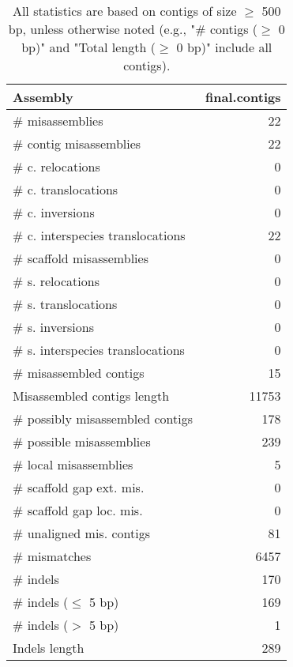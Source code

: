 \documentclass[12pt,a4paper]{article}
\begin{document}
\begin{table}[ht]
\begin{center}
\caption{All statistics are based on contigs of size $\geq$ 500 bp, unless otherwise noted (e.g., "\# contigs ($\geq$ 0 bp)" and "Total length ($\geq$ 0 bp)" include all contigs).}
\begin{tabular}{|l*{1}{|r}|}
\hline
Assembly & final.contigs \\ \hline
\# misassemblies & 22 \\ \hline
\hspace{2mm}\# contig misassemblies & 22 \\ \hline
\hspace{5mm}\# c. relocations & 0 \\ \hline
\hspace{5mm}\# c. translocations & 0 \\ \hline
\hspace{5mm}\# c. inversions & 0 \\ \hline
\hspace{5mm}\# c. interspecies translocations & 22 \\ \hline
\hspace{2mm}\# scaffold misassemblies & 0 \\ \hline
\hspace{5mm}\# s. relocations & 0 \\ \hline
\hspace{5mm}\# s. translocations & 0 \\ \hline
\hspace{5mm}\# s. inversions & 0 \\ \hline
\hspace{5mm}\# s. interspecies translocations & 0 \\ \hline
\# misassembled contigs & 15 \\ \hline
Misassembled contigs length & 11753 \\ \hline
\# possibly misassembled contigs & 178 \\ \hline
\hspace{5mm}\# possible misassemblies & 239 \\ \hline
\# local misassemblies & 5 \\ \hline
\# scaffold gap ext. mis. & 0 \\ \hline
\# scaffold gap loc. mis. & 0 \\ \hline
\# unaligned mis. contigs & 81 \\ \hline
\# mismatches & 6457 \\ \hline
\# indels & 170 \\ \hline
\hspace{5mm}\# indels ($\leq$ 5 bp) & 169 \\ \hline
\hspace{5mm}\# indels ($>$ 5 bp) & 1 \\ \hline
Indels length & 289 \\ \hline
\end{tabular}
\end{center}
\end{table}
\end{document}
